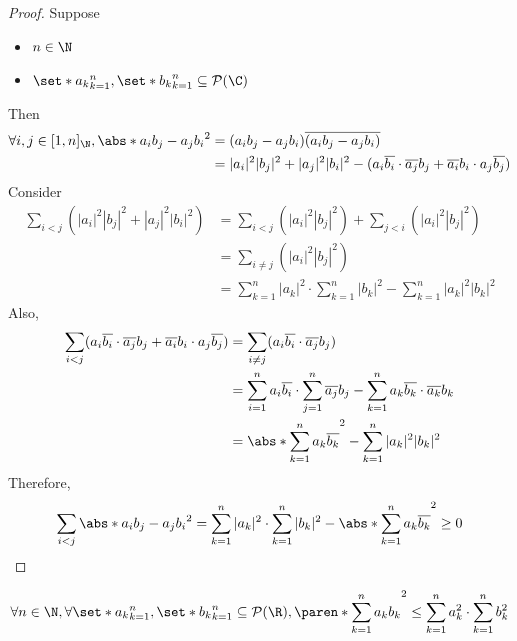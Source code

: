\begin{proof}
  Suppose
  \begin{itemize}
    \item $n \in \N$
    \item $\set*{a_{k}}_{k = 1}^{n}, \set*{b_{k}}_{k = 1}^{n} \subseteq \mathcal{P}(\C)$
  \end{itemize}
  Then
  \begin{align*}
    \forall i, j \in [1, n]_{\N}, \abs*{{a_{i} b_{j} - a_{j} b_{i}}}^{2}
     & = (a_{i} b_{j} - a_{j} b_{i}) \overline{(a_{i} b_{j} - a_{j} b_{i})}          \\
     & = |a_{i}|^{2} |b_{j}|^{2} + |a_{j}|^{2} |b_{i}|^{2} - (a_{i} \overline{b_{i}}
    \cdot \overline{a_{j}} b_{j} + \overline{a_{i}} b_{i} \cdot a_{j} \overline{b_{j}})
  \end{align*}
  Consider
  \begin{align*}
    \sum_{i < j} (|a_{i}|^{2} |b_{j}|^{2} + |a_{j}|^{2} |b_{i}|^{2})
     & = \sum_{i < j} (|a_{i}|^{2} |b_{j}|^{2}) + \sum_{j < i} (|a_{i}|^{2} |b_{j}|^{2}) \\
     & = \sum_{i \neq j} (|a_{i}|^{2} |b_{j}|^{2})                                       \\
     & = \sum_{k = 1}^{n} |a_{k}|^{2}
    \cdot \sum_{k = 1}^{n} |b_{k}|^{2} - \sum_{k = 1}^{n} |a_{k}|^{2} |b_{k}|^{2}
  \end{align*}
  Also,
  \begin{align*}
    \sum_{i < j} (a_{i} \overline{b_{i}} \cdot \overline{a_{j}} b_{j}
    + \overline{a_{i}} b_{i} \cdot a_{j} \overline{b_{j}})
     & = \sum_{i \neq j} (a_{i} \overline{b_{i}} \cdot \overline{a_{j}} b_{j})                         \\
     & = \sum_{i = 1}^{n} a_{i} \overline{b_{i}} \cdot \sum_{j = 1}^{n} \overline{a_{j}} b_{j}
    - \sum_{k = 1}^{n} a_{k} \overline{b_{k}} \cdot \overline{a_{k}} b_{k}                             \\
     & = \abs*{\sum_{k = 1}^{n} a_{k} \overline{b_{k}}}^{2} - \sum_{k = 1}^{n} |a_{k}|^{2} |b_{k}|^{2}
  \end{align*}
  Therefore,
  \[
    \sum_{i < j} \abs*{{a_{i} b_{j} - a_{j} b_{i}}}^{2} = \sum_{k = 1}^{n} |a_{k}|^{2} \cdot
    \sum_{k = 1}^{n} |b_{k}|^{2} - \abs*{\sum_{k = 1}^{n} a_{k} \overline{b_{k}}}^{2} \geq 0
  \]
\end{proof}

\begin{corollary} \label{an1:cor:cauchy-schwarz-inequality-for-real-numbers}
  \[
    \forall n \in \N, \forall \set*{a_{k}}_{k = 1}^{n}, \set*{b_{k}}_{k = 1}^{n} \subseteq \mathcal{P}(\R),
    \paren*{\sum_{k = 1}^{n} a_{k} b_{k}}^{2} \leq \sum_{k = 1}^{n} a_{k}^{2} \cdot \sum_{k = 1}^{n} b_{k}^{2}
  \]
\end{corollary}


